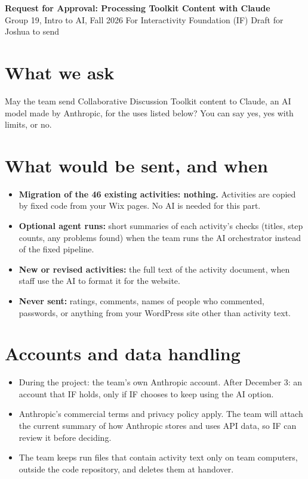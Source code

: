 


\begin{center}
{\Large\bfseries Request for Approval: Processing Toolkit Content with Claude}\\[3pt]
{\small Group 19, Intro to AI, Fall 2026 \textbullet{} For Interactivity Foundation (IF) \textbullet{} Draft for Joshua to send}
\end{center}

\section{What we ask}
May the team send Collaborative Discussion Toolkit content to Claude, an AI model made by
Anthropic, for the uses listed below? You can say yes, yes with limits, or no.

\section{What would be sent, and when}
\begin{itemize}
  \item \textbf{Migration of the 46 existing activities: nothing.} Activities are copied by fixed
        code from your Wix pages. No AI is needed for this part.
  \item \textbf{Optional agent runs:} short summaries of each activity's checks (titles, step
        counts, any problems found) when the team runs the AI orchestrator instead of the fixed
        pipeline.
  \item \textbf{New or revised activities:} the full text of the activity document, when staff
        use the AI to format it for the website.
  \item \textbf{Never sent:} ratings, comments, names of people who commented, passwords, or
        anything from your WordPress site other than activity text.
\end{itemize}

\section{Accounts and data handling}
\begin{itemize}
  \item During the project: the team's own Anthropic account. After December 3: an account
        that IF holds, only if IF chooses to keep using the AI option.
  \item Anthropic's commercial terms and privacy policy apply. The team will attach the current
        summary of how Anthropic stores and uses API data, so IF can review it before deciding.
  \item The team keeps run files that contain activity text only on team computers, outside the
        code repository, and deletes them at handover.
\end{itemize}

